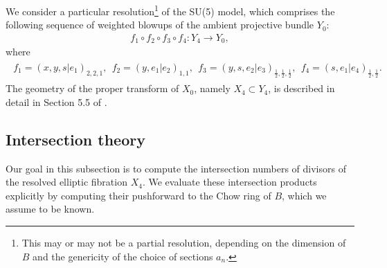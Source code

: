 \documentclass[11pt,oneside,english]{article}
\numberwithin{equation}{section}
\theoremstyle{definition}
\begin{document}
We consider a particular resolution\footnote{This may or may not be a partial resolution, depending on the dimension of $B$ and the genericity of the choice of sections $a_n$.} of the SU(5) model, which comprises the following sequence of weighted blowups of the ambient projective bundle $Y_0$:
	\begin{align}
	\label{eqn:SU5resolution}
		f_1 \circ f_2 \circ f_3 \circ f_4 : Y_4 \rightarrow Y_0,
	\end{align}
where
	\begin{align}
		\begin{split}
		\label{eqn:SU5resolution}
			 f_1 = (x,y,s|e_1)_{2,2,1},~~f_2 = (y,e_1|e_2)_{1,1},~~ f_3=(y,s,e_2|e_3)_{\frac{1}{2},\frac{1}{2},\frac{1}{2}} ,~~ f_4 =  (s,e_1|e_4)_{\frac{1}{2},\frac{1}{2}}.
		\end{split}
	\end{align}
The geometry of the proper transform of $X_0$, namely $X_4 \subset Y_4$, is described in detail in Section 5.5 of \cite{Esole:2014hya}. 

\subsection{Intersection theory}
\label{sec:SU5int}
Our goal in this subsection is to compute the intersection numbers of divisors of the resolved elliptic fibration $X_4$. We evaluate these intersection products explicitly by computing their pushforward to the Chow ring of $B$, which we assume to be known. 
\end{document}
